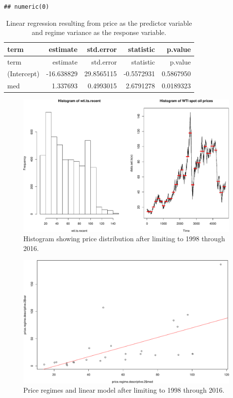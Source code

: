 \documentclass[11pt,]{article}
\begin{document}
\begin{verbatim}
## numeric(0)
\end{verbatim}

\begin{longtable}[]{@{}lrrrr@{}}
\caption{Linear regression resulting from price as the predictor
variable and regime variance as the response variable.}\tabularnewline
\toprule
term & estimate & std.error & statistic & p.value\tabularnewline
\midrule
\endfirsthead
\toprule
term & estimate & std.error & statistic & p.value\tabularnewline
\midrule
\endhead
(Intercept) & -16.638829 & 29.8565115 & -0.5572931 &
0.5867950\tabularnewline
med & 1.337693 & 0.4993015 & 2.6791278 & 0.0189323\tabularnewline
\bottomrule
\end{longtable}

\begin{figure}[htbp]
\centering
\includegraphics{Figs/unnamed-chunk-13-1.pdf}
\caption{Histogram showing price distribution after limiting to 1998
through 2016.}
\end{figure}

\begin{figure}[htbp]
\centering
\includegraphics{Figs/unnamed-chunk-15-1.pdf}
\caption{Price regimes and linear model after limiting to 1998 through
2016.}
\end{figure}
\end{document}
